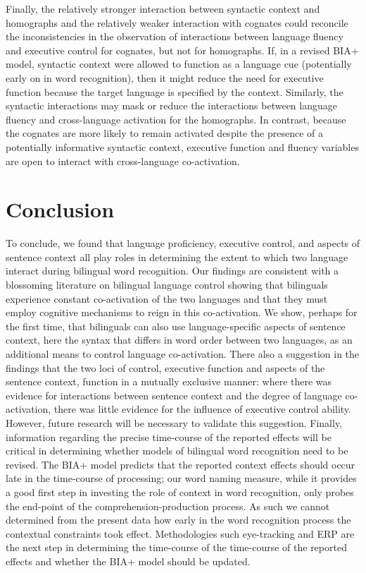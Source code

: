 Finally, the relatively stronger interaction between syntactic context and homographs and the relatively weaker interaction with cognates could reconcile the inconsistencies in the observation of interactions between language fluency and executive control for cognates, but not for homographs. If, in a revised BIA+ model, syntactic context were allowed to function as a language cue (potentially early on in word recognition), then it might reduce the need for executive function because the target language is specified by the context. Similarly, the syntactic interactions may mask or reduce the interactions between language fluency and cross-language activation for the homographs. In contrast, because the cognates are more likely to remain activated despite the presence of a potentially informative syntactic context, executive function and fluency variables are open to interact with cross-language co-activation. 

\section{Conclusion}
\label{conclusion}

To conclude, we found that language proficiency, executive control, and aspects of sentence context all play roles in determining the extent to which two language interact during bilingual word recognition. Our findings are consistent with a blossoming literature on bilingual language control showing that bilinguals experience constant co-activation of the two languages and that they must employ cognitive mechanisms to reign in this co-activation. We show, perhaps for the first time, that bilinguals can also use language-specific aspects of sentence context, here the syntax that differs in word order between two languages, as an additional means to control language co-activation. There also a suggestion in the findings that the two loci of control, executive function and aspects of the sentence context, function in a mutually exclusive manner: where there was evidence for interactions between sentence context and the degree of language co-activation, there was little evidence for the influence of executive control ability. However, future research will be necessary to validate this suggestion. Finally, information regarding the precise time-course of the reported effects will be critical in determining whether models of bilingual word recognition need to be revised. The BIA+ model predicts that the reported context effects should occur late in the time-course of processing; our word naming measure, while it provides a good first step in investing the role of context in word recognition, only probes the end-point of the comprehension-production process. As such we cannot determined from the present data how early in the word recognition process the contextual constraints took effect. Methodologies such eye-tracking and ERP are the next step in determining the time-course of the time-course of the reported effects and whether the BIA+ model should be updated. 

